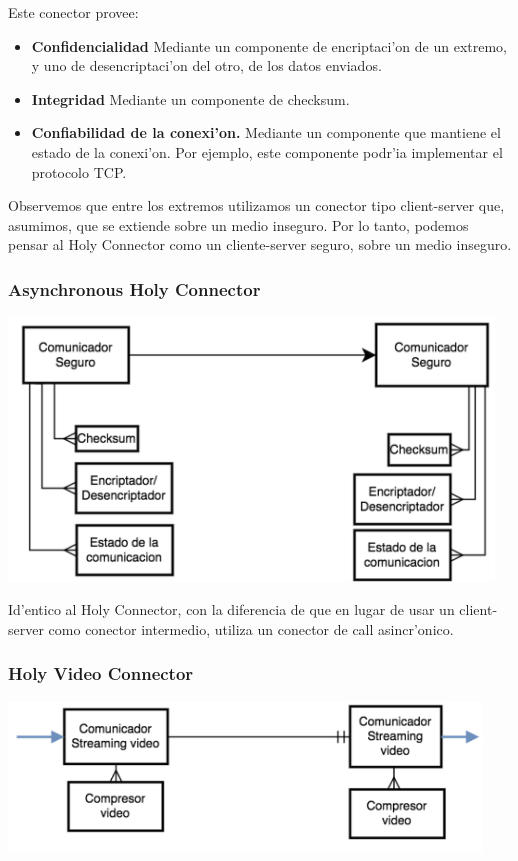 Este conector provee:

\begin{itemize}
	\item \textbf{Confidencialidad} Mediante un componente de encriptaci'on de un extremo, y uno de desencriptaci'on del otro, de los datos enviados.
	\item \textbf{Integridad} Mediante un componente de checksum.
	\item \textbf{Confiabilidad de la conexi'on.} Mediante un componente que mantiene el estado de la conexi'on. Por ejemplo, este componente podr'ia implementar el protocolo TCP.
\end{itemize}

Observemos que entre los extremos utilizamos un conector tipo client-server que, asumimos, que se extiende sobre un medio inseguro. Por lo tanto, podemos pensar al Holy Connector como un cliente-server seguro, sobre un medio inseguro.

\subsubsection{Asynchronous Holy Connector}

\includegraphics[height=7cm]{diagramas/HCCA} 

Id'entico al Holy Connector, con la diferencia de que en lugar de usar un client-server como conector intermedio, utiliza un conector de call asincr'onico.

\subsubsection{Holy Video Connector}

\includegraphics[height=4cm]{diagramas/HVC} 

